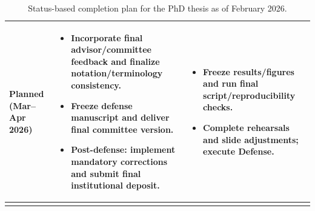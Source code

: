 ﻿\documentclass[../../ppgc-prop-tese.tex]{subfiles}
\begin{document}
\begin{longtable}{p{}p{}p{}}
\textbf{Planned (Mar--Apr 2026)} &
\begin{itemize}
  \item Incorporate final advisor/committee feedback and finalize notation/terminology consistency.
  \item Freeze defense manuscript and deliver final committee version.
  \item Post-defense: implement mandatory corrections and submit final institutional deposit.
\end{itemize}
&
\begin{itemize}
  \item Freeze results/figures and run final script/reproducibility checks.
  \item Complete rehearsals and slide adjustments; execute \textbf{Defense}.
\end{itemize}
\\
\hline
\caption{Status-based completion plan for the PhD thesis as of February 2026.}
\end{longtable}
\end{document}
